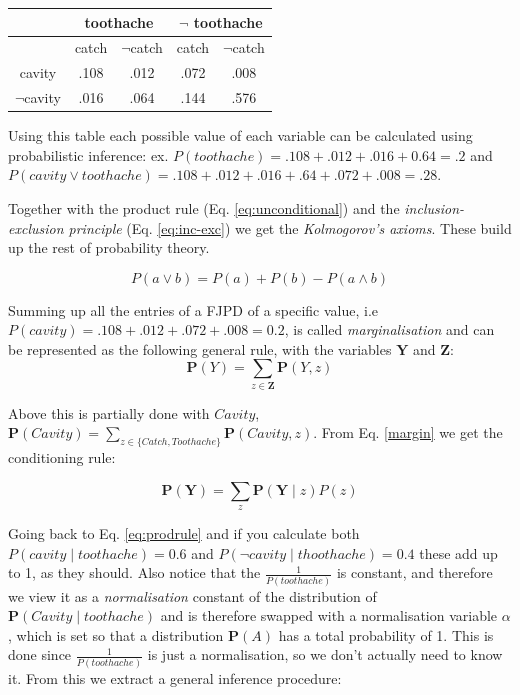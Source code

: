 \documentclass[11pt, letterpaper]{report}
\numberwithin{equation}{section}
\begin{document}
\begin{center}
  \begin{tabular}{|c|c|c|c|c|}
    \hline
    & \multicolumn{2}{|c|}{toothache} & \multicolumn{2}{|c|}{$\neg$ toothache} \\
    \hline
    & catch & $\neg$catch & catch & $\neg$catch \\
    \hline
    cavity       & .108 & .012 & .072 & .008 \\
    \hline
    $\neg$cavity & .016 & .064 & .144 & .576 \\
    \hline
  \end{tabular}
\end{center}
Using this table each possible value of each variable can be calculated using
probabilistic inference: ex.
$P(toothache) = .108 + .012 + .016 + 0.64 = .2$ and $P(cavity \vee
toothache) = .108 + .012 + .016 + .64 + .072 + .008 = .28$.

Together with the product rule (Eq. \ref{eq:unconditional}) and the
\emph{inclusion-exclusion principle} (Eq. \ref{eq:inc-exc}) we get the
\emph{Kolmogorov's axioms}. These build up the rest of probability theory.

\begin{equation}
  \label{eq:inc-exc}
  P(a \vee b) = P(a) + P(b) - P(a \wedge b)
\end{equation}

Summing up all the entries of a FJPD of a specific value, i.e $P(cavity) = .108
+ .012 + .072 + .008 = 0.2$, is called \emph{marginalisation} and can be
represented as the following general rule, with the variables $\boldsymbol{Y}$
and $\boldsymbol{Z}$:
\begin{equation}
  \label{eq:margin}
  \boldsymbol{P}(Y) = \sum_{z \in \boldsymbol{Z}} \boldsymbol{P}(Y,z)
\end{equation}

Above this is partially done with $Cavity$, $\boldsymbol{P}(Cavity) = \sum_{z
  \in \{Catch, Toothache\}}\boldsymbol{P}(Cavity, z)$. From Eq. \ref{margin} we
get the conditioning rule:

\setcounter{equation}{7}
\begin{equation}
  \label{eq:conditioning}
  \boldsymbol{P}(\boldsymbol{Y}) = \sum_{z}\boldsymbol{P}(\boldsymbol{Y} \mid z)P(z)
\end{equation}

Going back to Eq. \ref{eq:prodrule} and if you calculate both $P(cavity \mid
toothache) = 0.6$ and $P(\neg cavity \mid thoothache) = 0.4$ these add up to
1, as they should. Also notice that the $\frac{1}{P(toothache)}$ is constant,
and therefore we view it as a \emph{normalisation} constant of the distribution
of $\boldsymbol{P}(Cavity \mid toothache)$ and is therefore swapped with a
normalisation variable $\alpha$, which is set so that a distribution
$\boldsymbol{P}(A)$ has a total probability of 1. This is done since
$\frac{1}{P(toothache)}$ is just a normalisation, so we don't actually need to
know it. From this we extract a general inference procedure:
\end{document}
